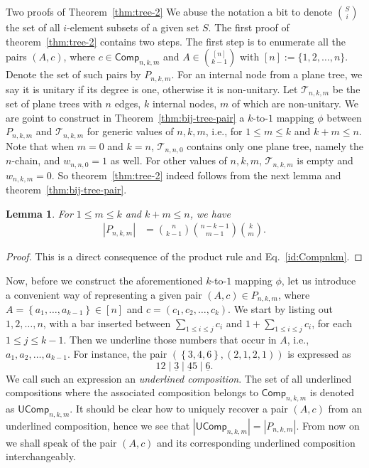 \documentclass[reqno]{amsart}
\makeatletter
\numberwithin{equation}{section}
\newtheorem{lemma}[theorem]{Lemma}
\theoremstyle{definition}
\theoremstyle{named}
\newcommand{\abs}[1]{\left|#1\right|}
\newcommand{\set}[1]{\left\{#1\right\}}
\def\section{\@startsection{section}{1}
  \z@{.7\linespacing\@plus\linespacing}{.5\linespacing}

  {\normalfont\scshape}}
\newcommand{\cT}{\mathcal{T}}
\def\Comp{\mathsf{Comp}}
\def\UComp{\mathsf{UComp}}
\makeatother
\begin{document}
\section{Two proofs of Theorem~\ref{thm:tree-2}}\label{sec:pf of tree-2}
We abuse the notation a bit to denote $\binom{S}{i}$ the set of all $i$-element subsets of a given set $S$. The first proof of theorem~\ref{thm:tree-2} contains two steps. The first step is to enumerate all the pairs $(A,c)$, where $c\in\Comp_{n,k,m}$ and $A\in\binom{[n]}{k-1}$ with $[n]:=\{1,2,\ldots,n\}$. Denote the set of such pairs by $P_{n,k,m}$. For an internal node from a plane tree, we say it is unitary if its degree is one, otherwise it is non-unitary. Let $\cT_{n,k,m}$ be the set of plane trees with $n$ edges, $k$ internal nodes, $m$ of which are non-unitary. We are goint to construct in Theorem~\ref{thm:bij-tree-pair} a $k$-to-$1$ mapping $\phi$ between $P_{n,k,m}$ and $\cT_{n,k,m}$ for generic values of $n,k,m$, i.e., for $1\le m\le k$ and $k+m\le n$. Note that when $m=0$ and $k=n$, $\cT_{n,n,0}$ contains only one plane tree, namely the $n$-chain, and $w_{n,n,0}=1$ as well. For other values of $n,k,m$, $\cT_{n,k,m}$ is empty and $w_{n,k,m}=0$. So theorem~\ref{thm:tree-2} indeed follows from the next lemma and theorem~\ref{thm:bij-tree-pair}.
\begin{lemma}\label{lem:pair enum}
For $1 \leq m \leq k$ and $k+m\le n$, we have
\begin{align}\label{pt-p}
\abs{P_{n,k,m}} &= \binom{n}{k-1} \binom{n-k-1}{m-1}\binom{k}{m}.
\end{align}
\end{lemma}
\begin{proof}
This is a direct consequence of the product rule and Eq.~\eqref{id:Compnkm}.
\end{proof}

Now, before we construct the aforementioned $k$-to-$1$ mapping $\phi$, let us introduce a convenient way of representing a given pair $(A,c)\in P_{n,k,m}$, where $A=\set{a_1,\ldots,a_{k-1}}\in[n]$ and $c=(c_1,c_2,\ldots,c_k)$. We start by listing out $1,2,\ldots,n$, with a bar inserted between $\sum_{1\le i\le j}c_i$ and $1+\sum_{1\le i\le j}c_i$, for each $1\le j\le k-1$. Then we underline those numbers that occur in $A$, i.e., $a_1,a_2,\ldots,a_{k-1}$. For instance, the pair $(\set{3,4,6},(2,1,2,1))$ is expressed as 
$$12\mid \underline{3}\mid \underline{4} 5\mid \underline{6}.$$
We call such an expression an {\it underlined composition}. The set of all underlined compositions where the associated composition belongs to $\Comp_{n,k,m}$ is denoted as $\UComp_{n,k,m}$. It should be clear how to uniquely recover a pair $(A,c)$ from an underlined composition, hence we see that $\abs{\UComp_{n,k,m}}=\abs{P_{n,k,m}}$. From now on we shall speak of the pair $(A,c)$ and its corresponding underlined composition interchangeably.
\end{document}
